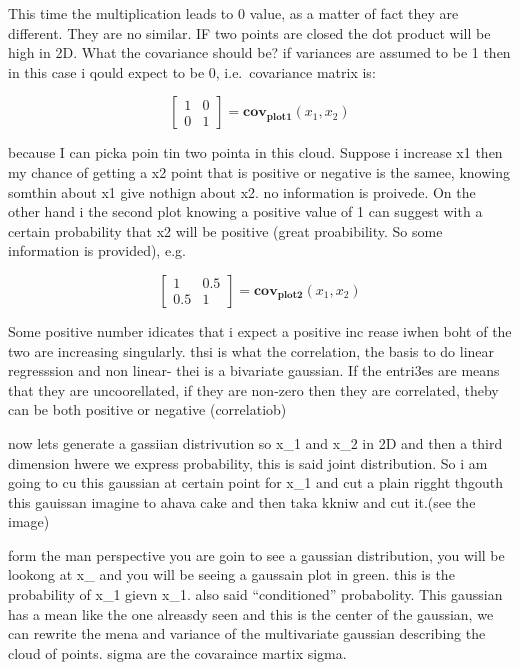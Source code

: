 \documentclass[
  12pt,
  a4paper,
  oneside]{book}
\theoremstyle{definition}
\theoremstyle{definition}
\theoremstyle{definition}
\theoremstyle{remark}
\begin{document}
This time the multiplication leads to 0 value, as a matter of fact they are different. They are no similar.
IF two points are closed the dot product will be high in 2D. What the covariance should be? if variances are assumed to be 1 then in this case i qould expect to be 0, i.e.~covariance matrix is:

\[
\left[\begin{array}{ll}
1 & 0 \\
0 & 1
\end{array}\right] = \mathbf{cov_{plot1}}(x_1,x_2)
\]

because I can picka poin tin two pointa in this cloud. Suppose i increase x1 then my chance of getting a x2 point that is positive or negative is the samee, knowing somthin about x1 give nothign about x2. no information is proivede. On the other hand i the second plot knowing a positive value of 1 can suggest with a certain probability that x2 will be positive (great proabibility. So some information is provided), e.g.

\[
\left[\begin{array}{ll}
1   & 0.5 \\
0.5 & 1
\end{array}\right] = \mathbf{cov_{plot2}}(x_1,x_2)
\]

Some positive number idicates that i expect a positive inc rease iwhen boht of the two are increasing singularly. thsi is what the correlation, the basis to do linear regresssion and non linear- thei is a bivariate gaussian. If the entri3es are means that they are uncoorellated, if they are non-zero then they are correlated, theby can be both positive or negative (correlatiob)

now lets generate a gassiian distrivution so x\_1 and x\_2 in 2D and then a third dimension hwere we express probability, this is said joint distribution. So i am going to cu this gaussian at certain point for x\_1 and cut a plain rigght thgouth this gauissan imagine to ahava cake and then taka kkniw and cut it.(see the image)

form the man perspective you are goin to see a gaussian distribution, you will be lookong at x\_ and you will be seeing a gaussain plot in green. this is the probability of x\_1 gievn x\_1. also said ``conditioned'' probabolity. This gaussian has a mean like the one alreasdy seen and this is the center of the gaussian, we can rewrite the mena and variance of the multivariate gaussian describing the cloud of points. sigma are the covaraince martix sigma.
\end{document}
